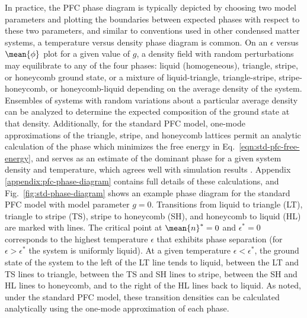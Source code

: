 %
In practice, the PFC phase diagram is typically depicted by choosing two model parameters and plotting the boundaries between expected phases with respect to these two parameters, and similar to conventions used in other condensed matter systems, a temperature versus density phase diagram is common.  On an $\epsilon$ versus $\mean{\phi}$ plot for a given value of $g$, a density field with random perturbations may equilibrate to any of the four phases: liquid (homogeneous), triangle, stripe, or honeycomb ground state, or a mixture of liquid-triangle, triangle-stripe, stripe-honeycomb, or honeycomb-liquid depending on the average density of the system.  Ensembles of systems with random variations about a particular average density can be analyzed to determine the expected composition of the ground state at that density.  Additionally, for the standard PFC model, one-mode approximations of the triangle, stripe, and honeycomb lattices permit an analytic calculation of the phase which minimizes the free energy in Eq.~\ref{eqn:std-pfc-free-energy}, and serves as an estimate of the dominant phase for a given system density and temperature, which agrees well with simulation results \cite{elder2002modeling}.  Appendix \ref{appendix:pfc-phase-diagram} contains full details of these calculations, and Fig.~\ref{fig:std-phase-diagram} shows an example phase diagram for the standard PFC model with model parameter $g=0$.  Transitions from liquid to triangle (LT), triangle to stripe (TS), stripe to honeycomb (SH), and honeycomb to liquid (HL) are marked with lines.  The critical point at $\mean{n}^*=0$ and $\epsilon^* = 0$ corresponds to the highest temperature $\epsilon$ that exhibits phase separation (for $\epsilon > \epsilon^*$ the system is uniformly liquid).  At a given temperature $\epsilon < \epsilon^*$, the ground state of the system to the left of the LT line tends to liquid, between the LT and TS lines to triangle, between the TS and SH lines to stripe, between the SH and HL lines to honeycomb, and to the right of the HL lines back to liquid.  As noted, under the standard PFC model, these transition densities can be calculated analytically using the one-mode approximation of each phase.

